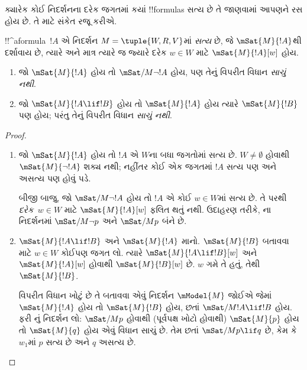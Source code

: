 \documentclass[../../../include/open-logic-section]{subfiles}
\begin{document}


ક્યારેક કોઈ નિદર્શનના દરેક જગતમાં કયાં !!{formula}s સત્ય છે
તે જાણવામાં આપણને રસ હોય છે. તે માટે સંકેત રજૂ કરીએ.

\begin{defn}
  !!^a{formula}~$!A$ એ નિદર્શન $M = \tuple{W, R,
    V}$માં \emph{સત્ય} છે, જે $\mSat{M}{!A}$થી દર્શાવાય છે,
  ત્યારે અને માત્ર ત્યારે જ જ્યારે દરેક $w \in W$ માટે
  $\mSat{M}{!A}[w]$ હોય.
\end{defn}

\begin{prop}
  \begin{enumerate}
  \item જો $\mSat{M}{!A}$ હોય તો $\mSat/{M}{\lnot !A}$ હોય,
    પણ તેનું વિપરીત વિધાન \emph{સાચું નથી}.
  \item જો $\mSat{M}{!A \lif !B}$ હોય તો $\mSat{M}{!A}$ હોય
    ત્યારે $\mSat{M}{!B}$ પણ હોય; પરંતુ તેનું વિપરીત વિધાન
    \emph{સાચું નથી}.
  \end{enumerate}
\end{prop}

\begin{proof}
  \begin{enumerate}
  \item જો $\mSat{M}{!A}$ હોય તો $!A$ એ $W$ના બધા જગતોમાં
    સત્ય છે. $W \neq \emptyset$ હોવાથી $\mSat{M}{\lnot!A}$
    શક્ય નથી; નહીંતર કોઈ એક જગતમાં $!A$ સત્ય પણ અને અસત્ય પણ
    હોવું પડે.

    બીજી બાજુ, જો $\mSat/{M}{\lnot !A}$ હોય તો $!A$ એ કોઈ
    $w \in W$માં સત્ય છે. તે પરથી \emph{દરેક}~$w \in W$ માટે
    $\mSat{M}{!A}[w]$ ફલિત થતું નથી. ઉદાહરણ તરીકે,
    ના નિદર્શનમાં $\mSat/{M}{\lnot p}$
    અને $\mSat/{M}{p}$ બંને છે.
  \item $\mSat{M}{!A \lif !B}$ અને $\mSat{M}{!A}$ માનો.
    $\mSat{M}{!B}$ બતાવવા માટે $w \in W$ કોઈપણ જગત લો.
    ત્યારે $\mSat{M}{!A \lif !B}[w]$ અને $\mSat{M}{!A}[w]$
    હોવાથી $\mSat{M}{!B}[w]$ છે. $w$ ગમે તે હતું, તેથી
    $\mSat{M}{!B}$.

    વિપરીત વિધાન ખોટું છે તે બતાવવા એવું નિદર્શન
    $\mModel{M}$ જોઈએ જેમાં $\mSat{M}{!A}$ હોય તો
    $\mSat{M}{!B}$ હોય, છતાં $\mSat/{M}{!A \lif !B}$ હોય.
    ફરી નું નિદર્શન લો:
    $\mSat/{M}{p}$ હોવાથી (પૂર્વપક્ષ ખોટો હોવાથી)
    $\mSat{M}{p}$ હોય તો $\mSat{M}{q}$ હોય એવું વિધાન સાચું છે.
    તેમ છતાં $\mSat/{M}{p \lif
      q}$ છે, કેમ કે~$w_1$માં $p$ સત્ય છે અને $q$ અસત્ય છે.
  \end{enumerate}
\end{proof}
\end{document}
